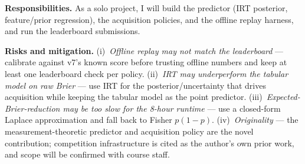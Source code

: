 \documentclass{article}
\begin{document}
\textbf{Responsibilities.} As a solo project, I will build the predictor (IRT
posterior, feature/prior regression), the acquisition policies, and the offline
replay harness, and run the leaderboard submissions.

\textbf{Risks and mitigation.} (i)~\emph{Offline replay may not match the
leaderboard} --- calibrate against v7's known score before trusting offline
numbers and keep at least one leaderboard check per policy. (ii)~\emph{IRT may
underperform the tabular model on raw Brier} --- use IRT for the posterior/uncertainty
that drives acquisition while keeping the tabular model as the point predictor.
(iii)~\emph{Expected-Brier-reduction may be too slow for the 8-hour runtime} ---
use a closed-form Laplace approximation and fall back to Fisher $p(1-p)$.
(iv)~\emph{Originality} --- the measurement-theoretic predictor and acquisition
policy are the novel contribution; competition infrastructure is cited as the
author's own prior work, and scope will be confirmed with course staff.



\end{document}
